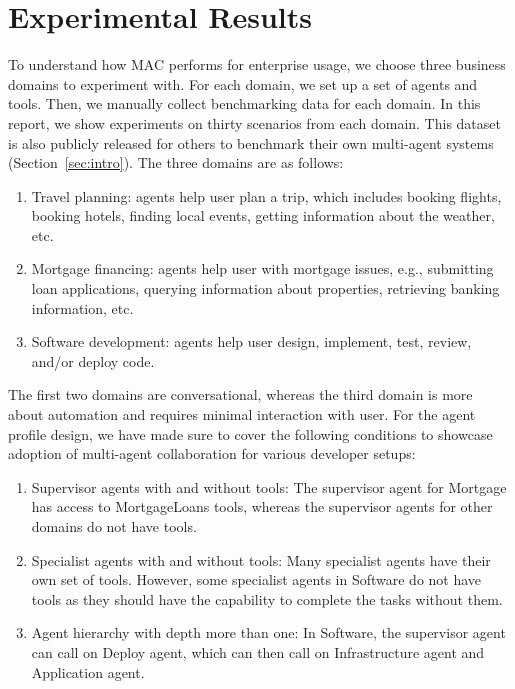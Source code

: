 \section{Experimental Results}
\label{sec:experiments}


To understand how MAC performs for enterprise usage, we choose three business domains to experiment with. For each domain, we set up a set of agents and tools. Then, we manually collect benchmarking data for each domain. In this report, we show experiments on thirty scenarios from each domain. This dataset is also publicly released for others to benchmark their own multi-agent systems (Section~\ref{sec:intro}). The three domains are as follows:
\begin{enumerate}
\item Travel planning: agents help user plan a trip, which includes booking flights, booking hotels, finding local events, getting information about the weather, etc.
\item Mortgage financing: agents help user with mortgage issues, e.g., submitting loan applications, querying information about properties, retrieving banking information, etc.
\item Software development: agents help user design, implement, test, review, and/or deploy code.
\end{enumerate}

The first two domains are conversational, whereas the third domain is more about automation and requires minimal interaction with user. For the agent profile design, we have made sure to cover the following conditions to showcase adoption of multi-agent collaboration for various developer setups:

\begin{enumerate}
\item Supervisor agents with and without tools: The supervisor agent for Mortgage has access to MortgageLoans tools, whereas the supervisor agents for other domains do not have tools.
\item Specialist agents with and without tools: Many specialist agents have their own set of tools. However, some specialist agents in Software do not have tools as they should have the capability to complete the tasks without them.
\item Agent hierarchy with depth more than one: In Software, the supervisor agent can call on Deploy agent, which can then call on Infrastructure agent and Application agent.
\end{enumerate}

